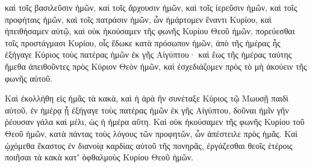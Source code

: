 {καὶ τοῖς βασιλεῦσιν ἡμῶν, καὶ τοῖς ἄρχουσιν ἡμῶν, καὶ τοῖς ἱερεῦσιν ἡμῶν, καὶ τοῖς προφήταις ἡμῶν, καὶ τοῖς πατράσιν ἡμῶν,
ὧν ἡμάρτομεν ἔναντι Κυρίου,
καὶ ἠπειθήσαμεν αὐτῷ, καὶ οὐκ ἠκούσαμεν τῆς φωνῆς Κυρίου Θεοῦ ἡμῶν, πορεύεσθαι τοῖς προστάγμασι Κυρίου, οἷς ἔδωκε κατὰ πρόσωπον ἡμῶν,
ἀπὸ τῆς ἡμέρας ἧς ἐξήγαγε Κύριος τοὺς πατέρας ἡμῶν ἐκ γῆς Αἰγύπτου· καὶ ἕως τῆς ἡμέρας ταύτης ἤμεθα ἀπειθοῦντες πρὸς Κύριον Θεὸν ἡμῶν, καὶ ἐσχεδιάζομεν πρὸς τὸ μὴ ἀκούειν τῆς φωνῆς αὐτοῦ.
\par }{\PP {}Καὶ ἐκολλήθη εἰς ἡμᾶς τὰ κακὰ, καὶ ἡ ἀρὰ ἣν συνέταξε Κύριος τῷ Μωυσῇ παιδὶ αὐτοῦ, ἐν ἡμέρᾳ ᾗ ἐξήγαγε τοὺς πατέρας ἡμῶν ἐκ γῆς Αἰγύπτου, δοῦναι ἡμῖν γῆν ῥέουσαν γάλα καὶ μέλι, ὡς ἡ ἡμέρα αὕτη.
Καὶ οὐκ ἠκούσαμεν τῆς φωνῆς Κυρίου τοῦ Θεοῦ ἡμῶν, κατὰ πάντας τοὺς λόγους τῶν προφητῶν, ὧν ἀπέστειλε πρὸς ἡμᾶς.
Καὶ ᾠχόμεθα ἕκαστος ἐν διανοίᾳ καρδίας αὐτοῦ τῆς πονηρᾶς, ἐργάζεσθαι θεοῖς ἑτέροις ποιῆσαι τὰ κακὰ κατʼ ὀφθαλμοὺς Κυρίου Θεοῦ ἡμῶν.

}
